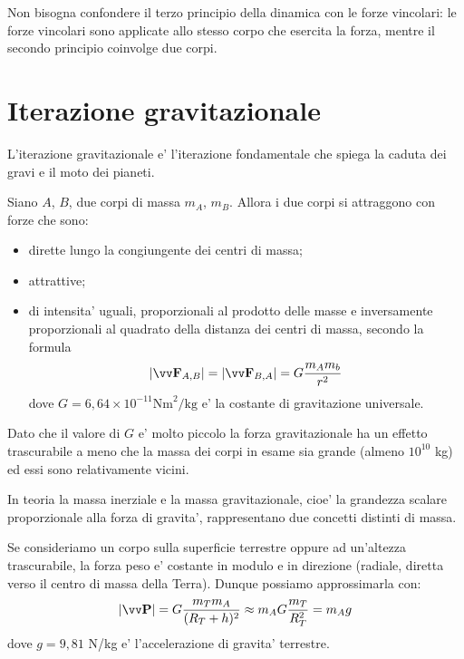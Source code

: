 Non bisogna confondere il terzo principio della dinamica con le forze vincolari: le forze vincolari sono applicate allo stesso corpo che esercita la forza, mentre il secondo principio coinvolge due corpi.

\section{Iterazione gravitazionale}
L'iterazione gravitazionale e' l'iterazione fondamentale che spiega la caduta dei gravi e il moto dei pianeti.

\begin{definition}
    Siano $A$, $B$, due corpi di massa $m_A$, $m_B$. Allora i due corpi si attraggono con forze che sono:
    \begin{itemize}
        \item dirette lungo la congiungente dei centri di massa;
        \item attrattive;
        \item di intensita' uguali, proporzionali al prodotto delle masse e inversamente proporzionali al quadrato della distanza dei centri di massa, secondo la formula
        \begin{equation} \label{forza_grav}
            \abs{\bvv{F}_{A, B}} = \abs{\bvv{F}_{B, A}} = G\frac{m_Am_b}{r^2}
        \end{equation}
        dove $G = 6,64 \times 10^{-11} \text{Nm}^2\text{/kg}$ e' la costante di gravitazione universale.
    \end{itemize}
\end{definition}

Dato che il valore di $G$ e' molto piccolo la forza gravitazionale ha un effetto trascurabile a meno che la massa dei corpi in esame sia grande (almeno $10^{10}$ kg) ed essi sono relativamente vicini.

In teoria la massa inerziale e la massa gravitazionale, cioe' la grandezza scalare proporzionale alla forza di gravita', rappresentano due concetti distinti di massa.

Se consideriamo un corpo sulla superficie terrestre oppure ad un'altezza trascurabile, la forza peso e' costante in modulo e in direzione (radiale, diretta verso il centro di massa della Terra). Dunque possiamo approssimarla con:
\begin{equation}
    \vmag{P} = G\frac{m_Tm_A}{(R_T + h)^2} \approx m_AG\frac{m_T}{R^2_T} = m_Ag
\end{equation}
dove $g = 9,81$ N/kg e' l'accelerazione di gravita' terrestre.

